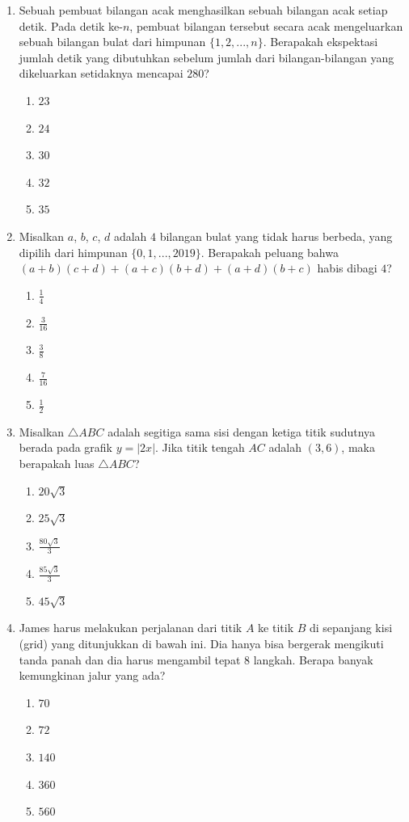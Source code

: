 \documentclass{article}
\begin{document}
\begin{enumerate}
\item Sebuah pembuat bilangan acak menghasilkan sebuah bilangan acak setiap detik. Pada detik ke-$n$, pembuat bilangan tersebut secara acak mengeluarkan sebuah bilangan bulat dari himpunan $\{1,2,..., n\}$. Berapakah ekspektasi jumlah detik yang dibutuhkan sebelum jumlah dari bilangan-bilangan yang dikeluarkan setidaknya mencapai $280$?
\begin{enumerate}
    \item $23$
    \item $24$
    \item $30$
    \item $32$
    \item $35$
\end{enumerate}

\item Misalkan $a$, $b$, $c$, $d$ adalah $4$ bilangan bulat yang tidak harus berbeda, yang dipilih dari himpunan $\{0,1,..., 2019\}$. Berapakah peluang bahwa $(a+b)(c+d)+(a+c)(b+d)+(a+d)(b+c)$ habis dibagi $4$?
\begin{enumerate}
    \item $\frac{1}{4}$
    \item $\frac{3}{16}$
    \item $\frac{3}{8}$
    \item $\frac{7}{16}$
    \item $\frac{1}{2}$
\end{enumerate}

\item Misalkan $\triangle ABC$ adalah segitiga sama sisi dengan ketiga titik sudutnya berada pada grafik $y=|2x|$. Jika titik tengah $AC$ adalah $(3,6)$, maka berapakah luas $\triangle ABC$?
\begin{enumerate}
    \item $20\sqrt{3}$
    \item $25\sqrt{3}$
    \item $\frac{80\sqrt{3}}{3}$
    \item $\frac{85\sqrt{3}}{3}$
    \item $45\sqrt{3}$
\end{enumerate}

\item James harus melakukan perjalanan dari titik $A$ ke titik $B$ di sepanjang kisi (grid) yang ditunjukkan di bawah ini. Dia hanya bisa bergerak mengikuti tanda panah dan dia harus mengambil tepat $8$ langkah. Berapa banyak kemungkinan jalur yang ada?
\begin{enumerate}
    \item $70$
    \item $72$
    \item $140$
    \item $360$
    \item $560$
\end{enumerate}


\end{enumerate}
\end{document}

